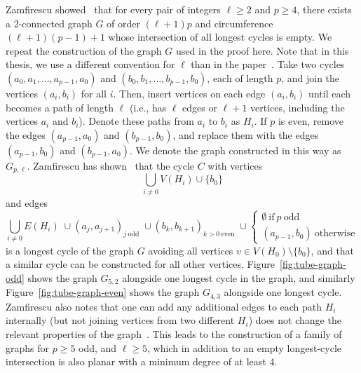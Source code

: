 Zamfirescu showed~\cite{article:zamfirescu} that for every pair of integers $\ell \ge 2$ and $p \ge 4$, there exists a 2-connected graph $G$ of order $(\ell+1) p$ and circumference $(\ell+1) (p-1) + 1$ whose intersection of all longest cycles is empty. We repeat the construction of the graph $G$ used in the proof here. Note that in this thesis, we use a different convention for $\ell$ than in the paper~\cite{article:zamfirescu}.
Take two cycles $(a_0, a_1, ..., a_{p-1}, a_0)$ and $(b_0, b_1, ..., b_{p-1}, b_0)$, each of length $p$, and join the vertices $(a_i, b_i)$ for all $i$. Then, insert vertices on each edge $(a_i, b_i)$ until each becomes a path of length $\ell$ (i.e., has $\ell$ edges or $\ell+1$ vertices, including the vertices $a_i$ and $b_i$). Denote these paths from $a_i$ to $b_i$ as $H_i$. If $p$ is even, remove the edges $(a_{p-1},a_0)$ and $(b_{p-1},b_0)$, and replace them with the edges $(a_{p-1},b_0)$ and $(b_{p-1},a_0)$. We denote the graph constructed in this way as $G_{p,\ell}$. Zamfirescu has shown~\cite{article:zamfirescu} that the cycle $C$ with vertices
$$
\bigcup_{i \neq 0} V(H_i) \cup \{b_0\}
$$
and edges
$$
\bigcup_{i \neq 0} E(H_i) \;
  \cup {(a_j,a_{j+1})}_{j\ \text{odd}} \;
  \cup {(b_k,b_{k+1})}_{k>0\ \text{even}} \;
  \cup \begin{cases}
    \emptyset\ \text{if}\ p\ \text{odd} \\
    (a_{p-1},b_0)\ \text{otherwise}
  \end{cases}
$$
is a longest cycle of the graph $G$ avoiding all vertices $v \in V(H_0) \setminus \{b_0\}$, and that a similar cycle can be constructed for all other vertices. Figure~\ref{fig:tube-graph-odd} shows the graph $G_{5,2}$ alongside one longest cycle in the graph, and similarly Figure~\ref{fig:tube-graph-even} shows the graph $G_{4,3}$ alongside one longest cycle. Zamfirescu also notes that one can add any additional edges to each path $H_i$ internally (but not joining vertices from two different $H_i$) does not change the relevant properties of the graph~\cite{article:zamfirescu}. This leads to the construction of a family of graphs for $p \ge 5$ odd, and $\ell \ge 5$, which in addition to an empty longest-cycle intersection is also planar with a minimum degree of at least 4.

